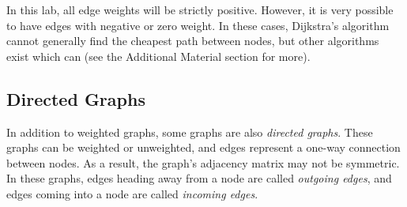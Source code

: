 \begin{info}
    In this lab, all edge weights will be strictly positive. However, it is very
    possible to have edges with negative or zero weight. In these cases, Dijkstra's algorithm
    cannot generally find the cheapest path between nodes, but other algorithms exist which can
    (see the Additional Material section for more).
\end{info}

\subsection*{Directed Graphs} %

In addition to weighted graphs, some graphs are also \emph{directed graphs}.
These graphs can be weighted or unweighted, and edges represent a one-way connection between nodes.
As a result, the graph's adjacency matrix may not be symmetric. In these graphs, edges heading away from a node are called \emph{outgoing edges}, and edges coming
into a node are called \emph{incoming edges}.

